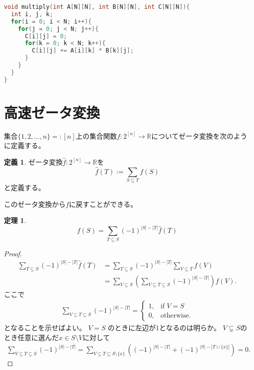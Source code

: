 \documentclass[a4paper,twoside,onecolumn,openany,article,10pt]{memoir}
\newtheorem{theorem}{定理}
\theoremstyle{definition}
\newtheorem{definition}{定義}
\theoremstyle{remark}
\begin{document}
\begin{lstlisting}[basicstyle=\ttfamily\normalsize,showstringspaces=false,language=C,frame=single]
void multiply(int A[N][N], int B[N][N], int C[N][N]){
  int i, j, k;
  for(i = 0; i < N; i++){
    for(j = 0; j < N; j++){
      C[i][j] = 0;
      for(k = 0; k < N; k++){
        C[i][j] += A[i][k] * B[k][j];
      }
    }
  }
}
\end{lstlisting}
\fi

\section{高速ゼータ変換}
集合$\{1,2,\dotsc,n\}=:[n]$上の集合関数$f\colon 2^{[n]}\to\mathbb{R}$についてゼータ変換を次のように定義する。
\begin{definition}
ゼータ変換$\widehat{f}\colon 2^{[n]}\to\mathbb{R}$を
\begin{equation*}
\widehat{f}(T) := \sum_{S\subseteq T} f(S)
\end{equation*}
と定義する。
\end{definition}
このゼータ変換から$f$に戻すことができる。
\begin{theorem}\label{thm:mobius}
\begin{equation*}
f(S) = \sum_{T\subseteq S} (-1)^{|S|-|T|} \widehat{f}(T)
\end{equation*}
\end{theorem}
\begin{proof}
\begin{align*}
\sum_{T\subseteq S} (-1)^{|S|-|T|} \widehat{f}(T)
&=
\sum_{T\subseteq S} (-1)^{|S|-|T|} \sum_{V\subseteq T}f(V)\\
&=
\sum_{V\subseteq S} \left(\sum_{V\subseteq T\subseteq S} (-1)^{|S|-|T|}\right) f(V).
\end{align*}
ここで
\begin{align*}
\sum_{V\subseteq T\subseteq S} (-1)^{|S|-|T|} = 
\begin{cases}
1,&\text{if } V = S\\
0,&\text{otherwise}.
\end{cases}
\end{align*}
となることを示せばよい。
$V = S$ のときに左辺が1となるのは明らか。
$V \subsetneq S$のとき任意に選んだ$x\in S\setminus V$に対して
\begin{align*}
\sum_{V\subseteq T\subseteq S} (-1)^{|S|-|T|} = 
\sum_{V\subseteq T\subseteq S\setminus\{x\}} \left((-1)^{|S|-|T|}  + (-1)^{|S|-|T\cup\{x\}|}\right)
=0.
\end{align*}
\end{proof}
\end{document}
